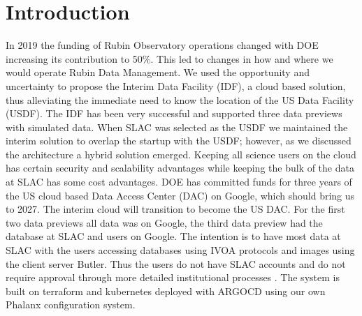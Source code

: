 \section{Introduction}
In 2019 the funding of Rubin Observatory operations changed with DOE increasing its contribution to 50\%. This led to changes in how and where we would operate Rubin Data Management. We used the opportunity and uncertainty to propose the Interim Data Facility (IDF), a cloud based solution,   thus alleviating the immediate need to know the location of the  US Data Facility (USDF). The IDF has been very successful and supported three data previews with simulated data. When SLAC was selected as the USDF we maintained the interim solution to overlap the startup with the USDF; however, as we discussed the architecture a hybrid solution emerged. Keeping all science users on the cloud has certain security and scalability advantages while keeping the bulk of the data at SLAC has some cost advantages. DOE has committed funds for three years of the US cloud based Data Access Center (DAC) on Google, which should bring us to 2027. The interim cloud will transition to become the US DAC. For the first two data previews all data was on Google, the third data preview had the database at SLAC and users on Google. The intention is to have most data at SLAC with the users accessing databases using IVOA protocols and images using the client server Butler. Thus the users do not have SLAC accounts and do not  require approval through more detailed institutional processes .  The system is built on terraform and kubernetes deployed with ARGOCD using our own Phalanx configuration system.











